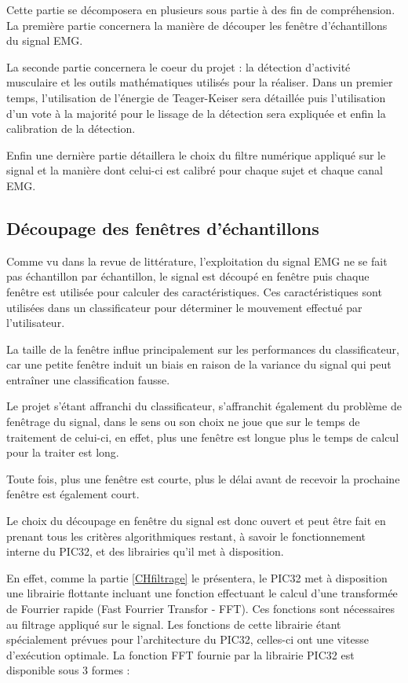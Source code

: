 \documentclass[letterpaper, twoside, 12pt, memoire, creativecommons, hyperref]{thETS}
\begin{document}
Cette partie se décomposera en plusieurs sous partie à des fin de compréhension. La première partie concernera la manière de découper les fenêtre d'échantillons du signal EMG. 

La seconde partie concernera le coeur du projet : la détection d'activité musculaire et les outils mathématiques utilisés pour la réaliser. Dans un premier temps, l'utilisation de l'énergie de Teager-Keiser sera détaillée puis l'utilisation d'un vote à la majorité pour le lissage de la détection sera expliquée et enfin la calibration de la détection.

Enfin une dernière partie détaillera le choix du filtre numérique appliqué sur le signal et la manière dont celui-ci est calibré pour chaque sujet et chaque canal EMG.

\subsection{Découpage des fenêtres d'échantillons}
\label{CHfenetrage}

Comme vu dans la revue de littérature, l'exploitation du signal EMG ne se fait pas échantillon par échantillon, le signal est découpé en fenêtre puis chaque fenêtre est utilisée pour calculer des caractéristiques. Ces caractéristiques sont utilisées dans un classificateur pour déterminer le mouvement effectué par l'utilisateur. 

La taille de la fenêtre influe principalement sur les performances du classificateur, car une petite fenêtre induit un biais en raison de la variance du signal qui peut entraîner une classification fausse. 

Le projet s'étant affranchi du classificateur, s'affranchit également du problème de fenêtrage du signal, dans le sens ou son choix ne joue que sur le temps de traitement de celui-ci, en effet, plus une fenêtre est longue plus le temps de calcul pour la traiter est long. 

Toute fois, plus une fenêtre est courte, plus le délai avant de recevoir la prochaine fenêtre est également court. 

Le choix du découpage en fenêtre du signal est donc ouvert et peut être fait en prenant tous les critères algorithmiques restant, à savoir le fonctionnement interne du PIC32, et des librairies qu'il met à disposition. 

En effet, comme la partie \ref{CHfiltrage} le présentera, le PIC32 met à disposition une librairie flottante incluant une fonction effectuant le calcul d'une transformée de Fourrier rapide (Fast Fourrier Transfor - FFT). Ces fonctions sont nécessaires au filtrage appliqué sur le signal. Les fonctions de cette librairie étant spécialement prévues pour l'architecture du PIC32, celles-ci ont une vitesse d'exécution optimale. La fonction FFT fournie par la librairie PIC32 est disponible sous 3 formes : 
\end{document}
